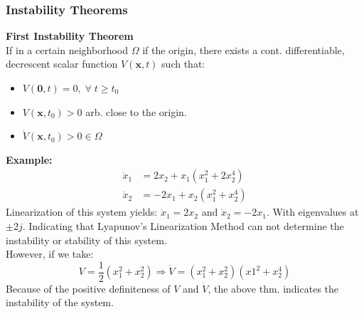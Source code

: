 \documentclass[11pt,handout]{beamer}   %
\begin{document}
\begin{frame}
\frametitle{Instability Theorems}
\footnotesize
\textbf{First Instability Theorem}\\
If in a certain neighborhood $\Omega$ if the origin, there exists a cont. differentiable, decrescent scalar function $V(\mathbf{x},t)$ such that:
\begin{itemize}
\item $V(\mathbf{0},t) = 0, \; \forall \; t \geq t_0$ 
\item $V(\mathbf{x},t_0) > 0$ arb. close to the origin.
\item $\dot{V}(\mathbf{x},t_0) > 0 \in \Omega$
\end{itemize}
\textbf{Example:}\\
\vspace{6pt}
\begin{equation*}
\begin{aligned}
\dot{x}_1 &= 2 x_2 + x_1 ( x_1^2 + 2 x_2^4)\\
\dot{x}_2 &= -2 x_1 + x_2 (x_1^2 + x_2^4)
\end{aligned}
\end{equation*}
Linearization of this system yields: $\dot{x}_1 = 2 x_2$ and $\dot{x}_2 = -2 x_1$. With eigenvalues at $\pm 2j$. Indicating that Lyapunov's Linearization Method can not determine the instability or stability of this system.\\
However, if we take:
\begin{equation*}
V = \frac{1}{2} (x_1^2 + x_2^2) \Rightarrow \dot{V} = (x_1^2 + x_2^2)(x1^2 + x_2^4)
\end{equation*}
Because of the positive definiteness of $V$ and $\dot{V}$, the above thm. indicates the instability of the system.
\end{frame}
\end{document}
